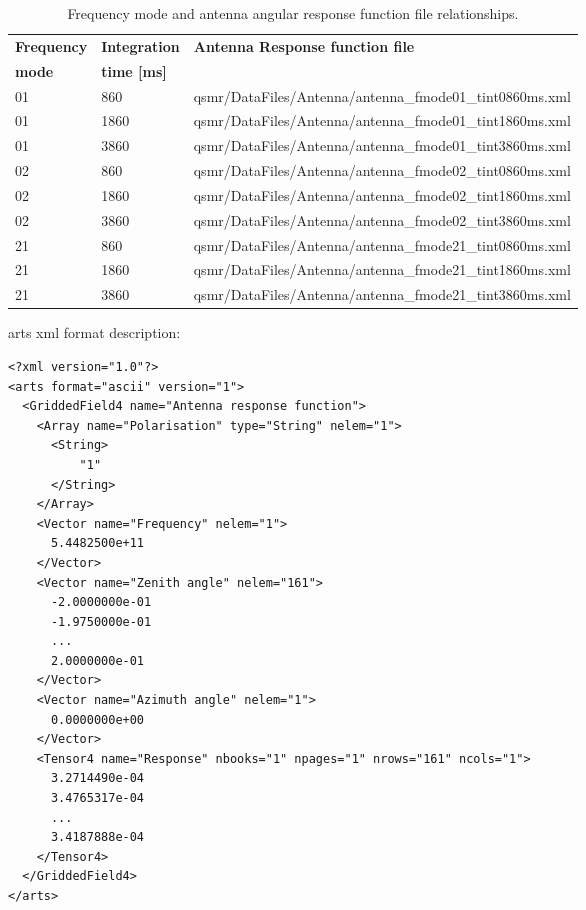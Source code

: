 \begin{table}
\caption{ Frequency mode and antenna angular response function file relationships.}
\label{table:antenna}
\begin{tabular}{|l|l|l|}
\hline
\textbf{Frequency} & \textbf{Integration} & \textbf{Antenna Response function file} \\
\textbf{mode} & \textbf{time [ms]} &  \\
\hline
  01 & 860  & qsmr/DataFiles/Antenna/antenna\_fmode01\_tint0860ms.xml \\ \hline                                                                      
  01 & 1860 & qsmr/DataFiles/Antenna/antenna\_fmode01\_tint1860ms.xml \\ \hline                                                               
  01 & 3860 & qsmr/DataFiles/Antenna/antenna\_fmode01\_tint3860ms.xml \\ \hline                                                                
  02 & 860  & qsmr/DataFiles/Antenna/antenna\_fmode02\_tint0860ms.xml \\ \hline                                        
  02 & 1860 & qsmr/DataFiles/Antenna/antenna\_fmode02\_tint1860ms.xml \\ \hline                                
  02 & 3860 & qsmr/DataFiles/Antenna/antenna\_fmode02\_tint3860ms.xml \\ \hline                                
  21 & 860  & qsmr/DataFiles/Antenna/antenna\_fmode21\_tint0860ms.xml \\ \hline       
  21 & 1860 & qsmr/DataFiles/Antenna/antenna\_fmode21\_tint1860ms.xml \\ \hline
  21 & 3860 & qsmr/DataFiles/Antenna/antenna\_fmode21\_tint3860ms.xml \\ \hline
\end{tabular}
\end{table}

arts xml format description:

\lstset{language=XML}
\begin{lstlisting}
<?xml version="1.0"?>
<arts format="ascii" version="1">
  <GriddedField4 name="Antenna response function">
    <Array name="Polarisation" type="String" nelem="1">
      <String>
          "1"
      </String>
    </Array>
    <Vector name="Frequency" nelem="1">
      5.4482500e+11
    </Vector>
    <Vector name="Zenith angle" nelem="161">
      -2.0000000e-01
      -1.9750000e-01
      ...
      2.0000000e-01
    </Vector>
    <Vector name="Azimuth angle" nelem="1">
      0.0000000e+00
    </Vector>
    <Tensor4 name="Response" nbooks="1" npages="1" nrows="161" ncols="1">
      3.2714490e-04
      3.4765317e-04 
      ...
      3.4187888e-04 
    </Tensor4>
  </GriddedField4>
</arts>
\end{lstlisting}

